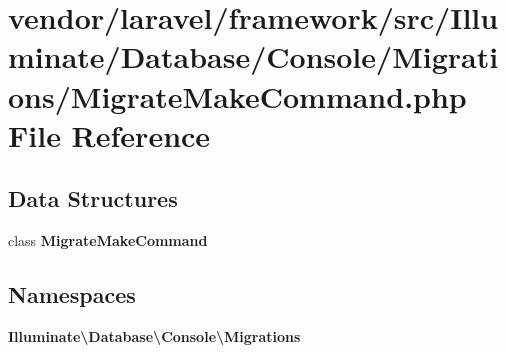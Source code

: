 \section{vendor/laravel/framework/src/\+Illuminate/\+Database/\+Console/\+Migrations/\+Migrate\+Make\+Command.php File Reference}
\label{_migrate_make_command_8php}
\subsection*{Data Structures}
\begin{DoxyCompactItemize}
\item 
class {\bf Migrate\+Make\+Command}
\end{DoxyCompactItemize}
\subsection*{Namespaces}
\begin{DoxyCompactItemize}
\item 
 {\bf Illuminate\textbackslash{}\+Database\textbackslash{}\+Console\textbackslash{}\+Migrations}
\end{DoxyCompactItemize}
